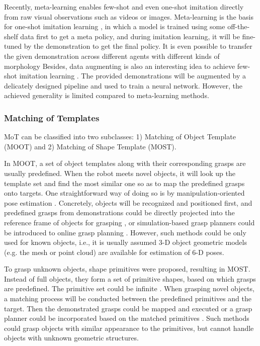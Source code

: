 \documentclass[letterpaper,10pt]{article}
\begin{document}
Recently, meta-learning \cite{vanschoren2018meta} enables few-shot and even one-shot imitation directly from raw visual observations such as videos or images.
Meta-learning is the basis for one-shot imitation learning \cite{duan2017one, finn2017one, mandi2021towards}, in which a model is trained using some off-the-shelf data first to get a meta policy, and during imitation learning, it will be fine-tuned by the demonstration to get the final policy.
It is even possible to transfer the given demonstration across different agents with different kinds of morphology \cite{yu2018one, yu2018oneb, dasari2020transformers, bonardi2020learning}
Besides, data augmenting is also an interesting idea to achieve few-shot imitation learning \cite{de2019learning}.
The provided demonstrations will be augmented by a delicately designed pipeline and used to train a neural network.
However, the achieved generality is limited compared to meta-learning methods. 

\subsubsection{Matching of Templates}
\label{sec:template-match}

MoT can be classified into two subclasses: 1) Matching of Object Template (MOOT) and 2) Matching of Shape Template (MOST).

In MOOT, a set of object templates along with their corresponding grasps are usually predefined.
When the robot meets novel objects, it will look up the template set and find the most similar one so as to map the predefined grasps onto targets.
One straightforward way of doing so is by manipulation-oriented pose estimation \cite{kragic2002model, ekvall2003object, collet2009object, marchand2015pose, tremblay2018deep}.
Concretely, objects will be recognized and positioned first, and predefined grasps from demonstrations could be directly projected into the reference frame of objects for grasping \cite{morales2006anthropomorphic, do2009grasp}, or simulation-based grasp planners could be introduced to online grasp planning \cite{kragic2001real, miller2004graspit, berenson2009manipulation}.
However, such methods could be only used for known objects, i.e., it is usually assumed 3-D object geometric models (e.g. the mesh or point cloud) are available for estimation of 6-D poses.

To grasp unknown objects, shape primitives were proposed, resulting in MOST.
Instead of full objects, they form a set of primitive shapes, based on which grasps are predefined.
The primitive set could be infinite \cite{pokorny2013grasp}.
When grasping novel objects, a matching process will be conducted between the predefined primitives and the target.
Then the demonstrated grasps could be mapped and executed \cite{miller2003automatic, hsiao2006imitation, ekvall2007learning, curtis2008efficient, herzog2012template, herzog2014learning} or a grasp planner could be incorporated based on the matched primitives \cite{goldfeder2007grasp, huebner2008minimum, el2008handling}.
Such methods could grasp objects with similar appearance to the primitives, but cannot handle objects with unknown geometric structures.
\end{document}
